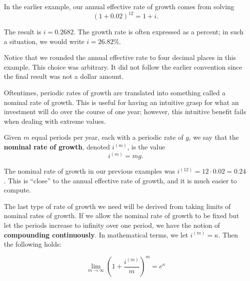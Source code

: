\documentclass{ximera}
\begin{document}
\begin{example}
In the earlier example, our annual effective rate of growth comes from solving
	\begin{equation*}
		(1+0.02)^{12}=1+i.
	\end{equation*}
\end{example}

\begin{solution}
	The result is $i=0.2682$. The growth rate is often expressed as a percent; in such a situation, we would write $i=26.82\%$. 
\end{solution}

Notice that we rounded the annual effective rate to four decimal places in this example. This choice was arbitrary. It did not follow the earlier convention since the final result was not a dollar amount.

Oftentimes, periodic rates of growth are translated into something called a nominal rate of growth. This is useful for having an intuitive grasp for what an investment will do over the course of one year; however, this intuitive benefit fails when dealing with extreme values.

\begin{definition}
Given $m$ equal periods per year, each with a periodic rate of $g$, we say that the {\bf nominal rate of growth}, denoted $i^{(m)}$, is the value
	\begin{equation*}
		i^{(m)}=mg.
	\end{equation*}

\end{definition}

\begin{example}
The nominal rate of growth in our previous examples was $i^{(12)}=12\cdot 0.02=0.24$. This is ``close'' to the annual effective rate of growth, and it is much easier to compute. 
\end{example}

The last type of rate of growth we need will be derived from taking limits of nominal rates of growth. If we allow the nominal rate of growth to be fixed but let the periods increase to infinity over one period, we have the notion of {\bf compounding continuously}. In mathematical terms, we let $i^{(m)}=\kappa$. Then the following holds:

\begin{equation*}
	\lim_{m\to\infty}\left(1+\frac{i^{(m)}}{m}\right)^m=e^\kappa
\end{equation*}
\end{document}
